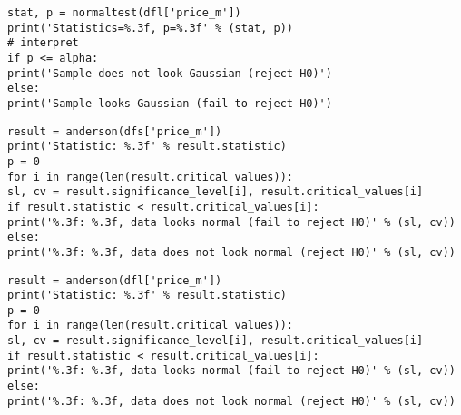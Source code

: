 \documentclass[]{scrreprt}
\begin{document}
%
\begin{lstlisting}[float=htp, caption = Performing the D'Agostino's K-squared test for Leningrad Region data, firstnumber=1, label= lst:K^2-D'Agostino-test-lo]
stat, p = normaltest(dfl['price_m'])
print('Statistics=%.3f, p=%.3f' % (stat, p))
# interpret
if p <= alpha:
print('Sample does not look Gaussian (reject H0)')
else:
print('Sample looks Gaussian (fail to reject H0)')
\end{lstlisting}  
%
\begin{lstlisting}[float=htp, caption = Performing the Anderson-Darling test for St.~Petersburg data, firstnumber=1, label= lst:Anderon-Darling-test-spb]
result = anderson(dfs['price_m'])
print('Statistic: %.3f' % result.statistic)
p = 0
for i in range(len(result.critical_values)):
sl, cv = result.significance_level[i], result.critical_values[i]
if result.statistic < result.critical_values[i]:
print('%.3f: %.3f, data looks normal (fail to reject H0)' % (sl, cv))
else:
print('%.3f: %.3f, data does not look normal (reject H0)' % (sl, cv))
\end{lstlisting}
%
\begin{lstlisting}[float=htp, caption = Performing the Anderson-Darling test for Leningrad Region data, firstnumber=1, label= lst:Anderon-Darling-test-lo]
result = anderson(dfl['price_m'])
print('Statistic: %.3f' % result.statistic)
p = 0
for i in range(len(result.critical_values)):
sl, cv = result.significance_level[i], result.critical_values[i]
if result.statistic < result.critical_values[i]:
print('%.3f: %.3f, data looks normal (fail to reject H0)' % (sl, cv))
else:
print('%.3f: %.3f, data does not look normal (reject H0)' % (sl, cv))
\end{lstlisting}  
%
\end{document}
